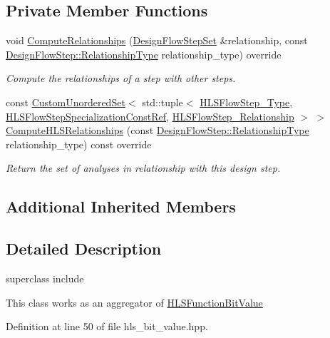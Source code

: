 \subsection*{Private Member Functions}
\begin{DoxyCompactItemize}
\item 
void \hyperlink{classHLSBitValue_ab1fe55bc2b8b26bd131e9aed874f5e94}{Compute\+Relationships} (\hyperlink{classDesignFlowStepSet}{Design\+Flow\+Step\+Set} \&relationship, const \hyperlink{classDesignFlowStep_a723a3baf19ff2ceb77bc13e099d0b1b7}{Design\+Flow\+Step\+::\+Relationship\+Type} relationship\+\_\+type) override
\begin{DoxyCompactList}\small\item\em Compute the relationships of a step with other steps. \end{DoxyCompactList}\item 
const \hyperlink{classCustomUnorderedSet}{Custom\+Unordered\+Set}$<$ std\+::tuple$<$ \hyperlink{hls__step_8hpp_ada16bc22905016180e26fc7e39537f8d}{H\+L\+S\+Flow\+Step\+\_\+\+Type}, \hyperlink{hls__step_8hpp_a5fdd2edf290c196531d21d68e13f0e74}{H\+L\+S\+Flow\+Step\+Specialization\+Const\+Ref}, \hyperlink{hls__step_8hpp_a3ad360b9b11e6bf0683d5562a0ceb169}{H\+L\+S\+Flow\+Step\+\_\+\+Relationship} $>$ $>$ \hyperlink{classHLSBitValue_ada9226f3cb7ef2e1f48d9268e440fa48}{Compute\+H\+L\+S\+Relationships} (const \hyperlink{classDesignFlowStep_a723a3baf19ff2ceb77bc13e099d0b1b7}{Design\+Flow\+Step\+::\+Relationship\+Type} relationship\+\_\+type) const override
\begin{DoxyCompactList}\small\item\em Return the set of analyses in relationship with this design step. \end{DoxyCompactList}\end{DoxyCompactItemize}
\subsection*{Additional Inherited Members}


\subsection{Detailed Description}
superclass include 

This class works as an aggregator of \hyperlink{classHLSFunctionBitValue}{H\+L\+S\+Function\+Bit\+Value} 

Definition at line 50 of file hls\+\_\+bit\+\_\+value.\+hpp.



